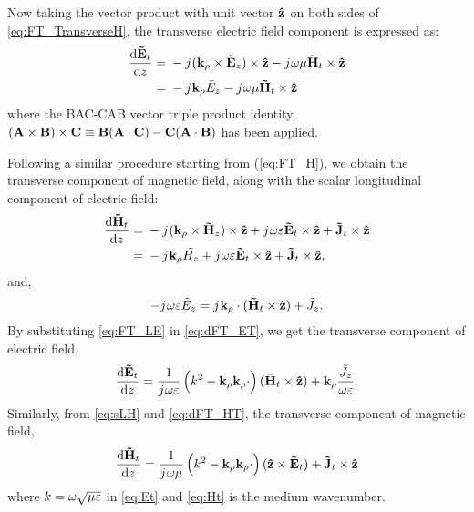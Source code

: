 %
Now taking the vector product with unit vector $\mathbf{\hat{z}}$ on both sides of \eqref{eq:FT_TransverseH}, the transverse electric field component is expressed as:
%
\begin{equation}
  \begin{split}
    \dv{\v{\ti{E}}_t}{z} ={}& -\j (\v{k}_{\p} \x \v{\ti{E}}_z) \x \v{\^{z}}
    -\j \O \u \v{\ti{H}}_t \x \v{\^{z}}\\
    ={}& -\j \v{k}_{\p} \ti{{E}}_z -\j \O \u \v{\ti{H}}_t \x \v{\^{z}}
  \end{split}
  \label{eq:dFT_ET}%
\end{equation}
%
where the BAC-CAB vector triple product identity, $(\mathbf{A} \times \mathbf{B})\times\mathbf{C} \equiv \mathbf{B}(\mathbf{A} \cdot \mathbf{C}) - \mathbf{C}(\mathbf{A} \cdot \mathbf{B})$ has been applied.

Following a similar procedure starting from (\ref{eq:FT_H}), we obtain the transverse component of magnetic field, along with the scalar longitudinal component of electric field:
%
\begin{equation}
  \begin{split}
    \dv{\v{\ti{H}}_t}{z} ={}& -\j (\v{k}_{\p} \x \v{\ti{H}}_z) \x \v{\^{z}}
    + \j \O \E \v{\ti{E}}_t \x \v{\^{z}} +
    \v{\ti{J}}_t \x \v{\^{z}} \\
    ={}& -\j \v{k}_{\p} \ti{{H}_z} + \j \O \E \v{\ti{E}}_t \x \v{\^{z}}  +
    \v{\ti{J}}_t \x \v{\^{z}},
  \end{split}
  \label{eq:dFT_HT}%
\end{equation}
%
and,
\begin{equation}
  -{j}\mkern1mu \omega \varepsilon \tilde{E}_z =
  {j}\mkern1mu \mathbf{k}_{\rho} \cdot (\mathbf{\tilde{H}}_t \times \mathbf{\hat{z}}) + \tilde{J}_z.
  \label{eq:FT_LE}
\end{equation}
%
By substituting \eqref{eq:FT_LE} in \eqref{eq:dFT_ET}, we get the transverse component of electric field,
%
\begin{equation}
  \dv{\mathbf{\tilde{E}}_t}{z} =
  \frac{1}{{j}\mkern1mu \omega \varepsilon} \left( k^2 - \mathbf{k}_{\rho}\mathbf{k}_{\rho} \cdot \right) (\mathbf{\tilde{H}}_t \times \mathbf{\hat{z}}) + \mathbf{k}_{\rho} \frac{\tilde{J}_z}{\omega \varepsilon}.
  \label{eq:Et}
\end{equation}
%
Similarly, from \eqref{eq:sLH} and \eqref{eq:dFT_HT}, the transverse component of magnetic field,
%
\begin{equation}
  \dv{\mathbf{\tilde{H}}_t}{z} =
  \frac{1}{{j}\mkern1mu \omega \mu} \left( k^2 - \mathbf{k}_{\rho}\mathbf{k}_{\rho} \cdot \right) (\mathbf{\hat{z}} \times \mathbf{\tilde{E}}_t) + \mathbf{\tilde{J}}_t
  \times \mathbf{\hat{z}}
  \label{eq:Ht}
\end{equation}
%
where $k = \omega \sqrt{\mu \varepsilon}$ in \eqref{eq:Et} and \eqref{eq:Ht} is the medium wavenumber.

